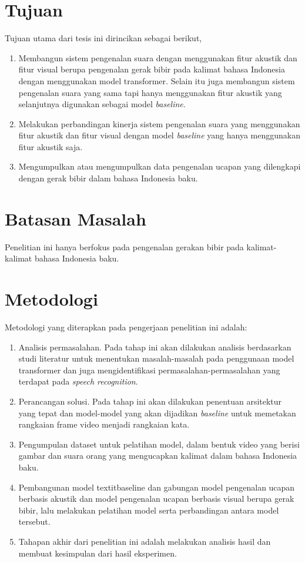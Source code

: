 \section{Tujuan}

Tujuan utama dari tesis ini dirincikan sebagai berikut,

\begin{enumerate}
    \item Membangun sistem pengenalan suara dengan menggunakan fitur akustik dan fitur visual berupa pengenalan gerak bibir pada kalimat bahasa Indonesia dengan menggunakan model transformer. Selain itu juga membangun sistem pengenalan suara yang sama tapi hanya menggunakan fitur akustik yang selanjutnya digunakan sebagai model \textit{baseline}.
    \item Melakukan perbandingan kinerja sistem pengenalan suara yang menggunakan fitur akustik dan fitur visual dengan model \textit{baseline} yang hanya menggunakan fitur akustik saja.
    \item Mengumpulkan atau mengumpulkan data pengenalan ucapan yang dilengkapi dengan gerak bibir dalam bahasa Indonesia baku.
\end{enumerate}


\section{Batasan Masalah}

Penelitian ini hanya berfokus pada pengenalan gerakan bibir pada kalimat-kalimat bahasa Indonesia baku.


\section{Metodologi}

Metodologi yang diterapkan pada pengerjaan penelitian ini adalah:
\begin{enumerate}
    \item Analisis permasalahan. Pada tahap ini akan dilakukan analisis berdasarkan studi literatur untuk menentukan masalah-masalah pada penggunaan model transformer dan juga mengidentifikasi permasalahan-permasalahan yang terdapat pada \textit{speech recognition}.
    \item Perancangan solusi. Pada tahap ini akan dilakukan penentuan arsitektur yang tepat dan model-model yang akan dijadikan \textit{baseline} untuk memetakan rangkaian frame video menjadi rangkaian kata.
    \item Pengumpulan dataset untuk pelatihan model, dalam bentuk video yang berisi gambar dan suara orang yang mengucapkan kalimat dalam bahasa Indonesia baku.
    \item Pembangunan model textit{baseline} dan gabungan model pengenalan ucapan berbasis akustik dan model pengenalan ucapan berbasis visual berupa gerak bibir, lalu melakukan pelatihan model serta perbandingan antara model tersebut.
    \item Tahapan akhir dari penelitian ini adalah melakukan analisis hasil dan membuat kesimpulan dari hasil eksperimen.
\end{enumerate} 


